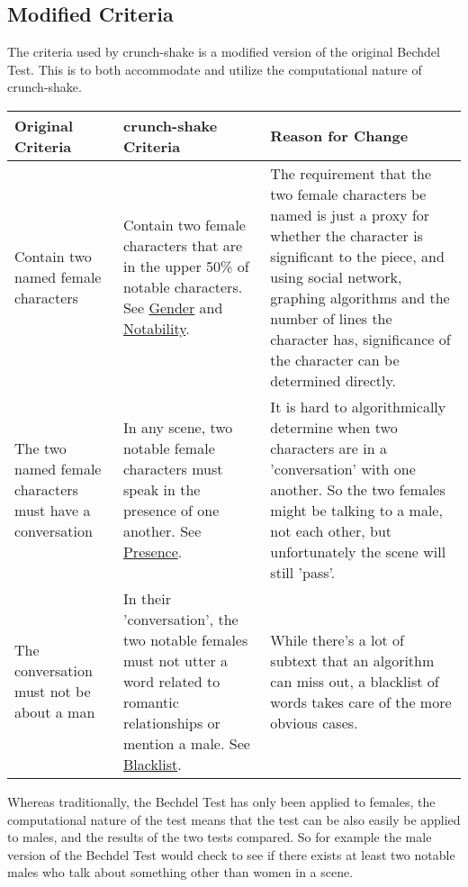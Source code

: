 \documentclass[12pt]{article}
\begin{document}
\subsection{Modified Criteria}
\label{sub:crunch_shake_s_new_criteria}
The criteria used by crunch-shake is a modified version of the original
Bechdel Test. This is to both accommodate and utilize the computational nature
of crunch-shake. 
\begin{center}
    \begin{tabularx}{\textwidth}{ X X X }
    \toprule
    Original Criteria & crunch-shake Criteria & Reason for Change \\ \midrule
        Contain two named female characters & Contain two female characters
        that are in the upper 50\% of notable characters. See
        \hyperref[sub:gender]{Gender} and
        \hyperref[sub:notability]{Notability}.
        & The requirement that the two female characters be named is just a
        proxy for whether the character is significant to the piece, and using
        social network, graphing algorithms and the number of lines the
        character has, significance of the character can be determined directly.
        \\ \hline
    The two named female characters must have a conversation & In any scene,
        two notable female characters must speak in the presence of one
        another.
        See \hyperref[sub:presence]{Presence}.
        & It is hard to algorithmically determine when two characters are in a
        'conversation' with one another. So the two females might be talking to
        a male, not each other, but unfortunately the scene will still
        'pass'. \\ \hline
    The conversation must not be about a man & In their 'conversation', the two
        notable females must not utter a word related to romantic relationships
        or mention a male. See \hyperref[sub:blacklist]{Blacklist}. & While
        there's a lot of subtext that an algorithm can miss out, a blacklist of
        words takes care of the more obvious
        cases. \\
    \bottomrule
    \end{tabularx}
\end{center}
Whereas traditionally, the Bechdel Test
has only been applied to females, the computational nature of the test means
that the test can be also easily be applied to males, and the results of the
two tests compared. So for example the male version of the Bechdel Test would
check to see if there exists at least two notable males who talk about
something other than women in a scene. 
\end{document}
